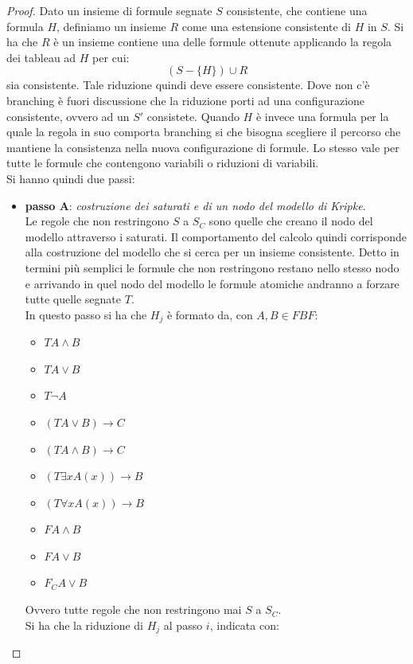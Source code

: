 \documentclass[a4paper,12pt, oneside]{book}
\begin{document}
\begin{proof}
  Dato un insieme di formule segnate $S$ consistente, che contiene una formula
  $H$, definiamo un insieme $R$ come una estensione consistente di $H$ in
  $S$. Si ha che $R$ è un insieme contiene una delle formule ottenute applicando
  la regola dei tableau ad $H$ per cui: 
  \[(S - \{H\})\cup R\]
  sia consistente. Tale riduzione quindi deve essere consistente. Dove non c'è
  branching è fuori discussione che la riduzione porti ad una configurazione
  consistente, ovvero ad un $S'$ consistete. Quando $H$ è invece una formula per
  la quale la regola in suo comporta branching si che bisogna scegliere il
  percorso che mantiene la consistenza nella nuova configurazione di formule.
  Lo stesso vale per tutte le formule che contengono variabili o riduzioni di
  variabili.\\
  Si hanno quindi due passi:
  \begin{itemize}
    \item \textbf{passo A}: \textit{costruzione dei saturati e di un
      nodo del modello di Kripke}. \\
    Le regole che non restringono $S$ a $S_C$ sono quelle che creano il nodo del
    modello attraverso i saturati. Il comportamento del calcolo quindi
    corrisponde alla costruzione del modello che si cerca per un insieme
    consistente. Detto in termini più semplici le formule che non restringono
    restano nello stesso nodo e arrivando in quel nodo del modello le formule
    atomiche andranno a forzare tutte quelle segnate $T$.\\
    In questo passo si ha che $H_j$ è formato da, con $A,B\in FBF$:
    \begin{itemize}
      \item $TA\land B$
      \item $TA\lor B$
      \item $T\neg A$
      \item $(TA\lor B)\to C$
      \item $(TA\land B)\to C$
      \item $(T\exists xA(x))\to B$
      \item $(T\forall xA(x))\to B$
      \item $FA\land B$
      \item $FA\lor B$
      \item $F_CA\lor B$
    \end{itemize}
    Ovvero tutte regole che non restringono mai $S$ a $S_C$.\\
    Si ha che la riduzione di $H_j$ al passo $i$, indicata con:

\end{itemize}
\end{proof}
\end{document}
